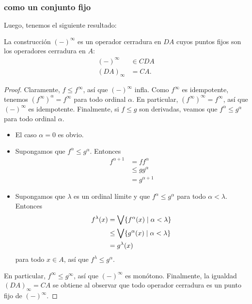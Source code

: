 \subsubsection{ como un conjunto fijo}
Luego, tenemos el siguiente resultado:
\begin{thm}
    La construcción $({-})^\infty$ es un operador cerradura en $DA$
    cuyos puntos fijos son los operadores cerradura en $A$:
    \begin{align*}
      ({-})^\infty &\in CDA \\
      (DA)_\infty &= CA.
    \end{align*}
\end{thm}
\begin{proof}
  Claramente, $f\leq f^\infty$, así que $(-)^\infty$ infla.
  Como $f^\infty$ es idempotente, tenemos $(f^\infty)^\alpha=f^\infty$
  para todo ordinal $\alpha$.
  En particular, $(f^\infty)^\infty=f^\infty$, así que
  $(-)^\infty$ es idempotente.
  Finalmente, si $f\leq g$ son derivadas, veamos que
  $f^\alpha\leq g^\alpha$ para todo ordinal $\alpha$.
  \begin{itemize}
    \item El caso $\alpha=0$ es obvio.
    \item Supongamos que $f^\alpha\leq g^\alpha$.
    Entonces
    \begin{align*}
        f^{\alpha+1}
        &= ff^\alpha \\
        &\leq gg^\alpha \\
        &= g^{\alpha+1}
    \end{align*}
    \item Supongamos que $\lambda$ es un ordinal límite y que
    $f^\alpha\leq g^\alpha$ para todo $\alpha<\lambda$.
    Entonces
    \begin{align*}
        f^\lambda(x)
        &= \bigvee\{f^\alpha(x)\mid \alpha<\lambda\} \\
        &\leq \bigvee\{g^\alpha(x) \mid \alpha<\lambda\} \\
        &= g^\lambda(x)
    \end{align*}
    para todo $x\in A$, así que $f^\lambda\leq g^\alpha$.
  \end{itemize}
  En particular, $f^\infty\leq g^\infty$, así que $(-)^\infty$ es
  monótono.
  Finalmente, la igualdad $(DA)_\infty=CA$ se obtiene al observar
  que todo operador cerradura es un punto fijo de $(-)^\infty$.
\end{proof}


